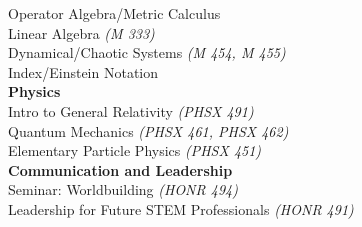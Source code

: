 \documentclass[margin]{res}
\begin{document}
\begin{resume}
{	\hspace{3ex} Operator Algebra/Metric Calculus\\
	\hspace{3ex} Linear Algebra \textit{(M 333)}\\
	\hspace{3ex} Dynamical/Chaotic Systems \textit{(M 454, M 455)}\\
	\hspace{3ex} Index/Einstein Notation\vspace*{1ex}\\
\textbf{Physics}\\
	\hspace{3ex} Intro to General Relativity \textit{(PHSX 491)}\\
	\hspace{3ex} Quantum Mechanics \textit{(PHSX 461, PHSX 462)}\\
	\hspace{3ex} Elementary Particle Physics \textit{(PHSX 451)}\vspace*{1ex}\\
\textbf{Communication and Leadership}\\
	\hspace{3ex} Seminar: Worldbuilding \textit{(HONR 494)}\\
	\hspace{3ex} Leadership for Future STEM Professionals \textit{(HONR 491)}\\
}






\end{resume}
\end{document}
